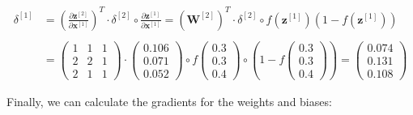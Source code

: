 \documentclass[12pt]{article}
\begin{document}
\begin{enumerate}
\begin{equation*}
    \begin{aligned}
        \delta^{[1]} &= \left(\frac{\partial \mathbf{z}^{[2]}}{\partial \mathbf{x}^{[1]}}\right)^T \cdot \delta^{[2]} \circ \frac{\partial \mathbf{z}^{[1]}}{\partial \mathbf{x}^{[1]}} = \left(\mathbf{W}^{[2]}\right)^T \cdot \delta^{[2]} \circ f(\mathbf{z}^{[1]})(1 - f(\mathbf{z}^{[1]}))\\
        \\
        &= \begin{pmatrix}
            1 & 1 & 1\\
            2 & 2 & 1\\
            2 & 1 & 1
        \end{pmatrix} \cdot \begin{pmatrix}
            0.106\\
            0.071\\
            0.052
        \end{pmatrix} \circ f\begin{pmatrix}
            0.3\\
            0.3\\
            0.4
        \end{pmatrix} \circ \left(1 - f\begin{pmatrix}
            0.3\\
            0.3\\
            0.4
        \end{pmatrix}\right) = \begin{pmatrix}
            0.074\\
            0.131\\
            0.108
        \end{pmatrix}
    \end{aligned}
\end{equation*}

Finally, we can calculate the gradients for the weights and biases:


\end{enumerate}
\end{document}
